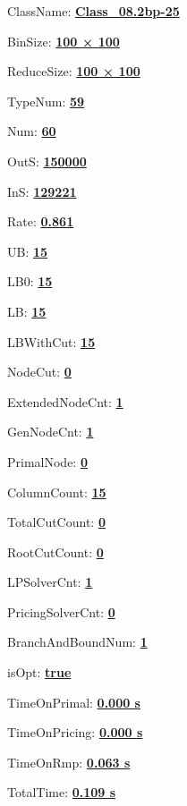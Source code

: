 \documentclass[11pt]{article}
\begin{document}
\pagestyle{empty}


ClassName: \underline{\textbf{Class_08.2bp-25}}
\par
BinSize: \underline{\textbf{100 × 100}}
\par
ReduceSize: \underline{\textbf{100 × 100}}
\par
TypeNum: \underline{\textbf{59}}
\par
Num: \underline{\textbf{60}}
\par
OutS: \underline{\textbf{150000}}
\par
InS: \underline{\textbf{129221}}
\par
Rate: \underline{\textbf{0.861}}
\par
UB: \underline{\textbf{15}}
\par
LB0: \underline{\textbf{15}}
\par
LB: \underline{\textbf{15}}
\par
LBWithCut: \underline{\textbf{15}}
\par
NodeCut: \underline{\textbf{0}}
\par
ExtendedNodeCnt: \underline{\textbf{1}}
\par
GenNodeCnt: \underline{\textbf{1}}
\par
PrimalNode: \underline{\textbf{0}}
\par
ColumnCount: \underline{\textbf{15}}
\par
TotalCutCount: \underline{\textbf{0}}
\par
RootCutCount: \underline{\textbf{0}}
\par
LPSolverCnt: \underline{\textbf{1}}
\par
PricingSolverCnt: \underline{\textbf{0}}
\par
BranchAndBoundNum: \underline{\textbf{1}}
\par
isOpt: \underline{\textbf{true}}
\par
TimeOnPrimal: \underline{\textbf{0.000 s}}
\par
TimeOnPricing: \underline{\textbf{0.000 s}}
\par
TimeOnRmp: \underline{\textbf{0.063 s}}
\par
TotalTime: \underline{\textbf{0.109 s}}
\par
\newpage


\end{document}
